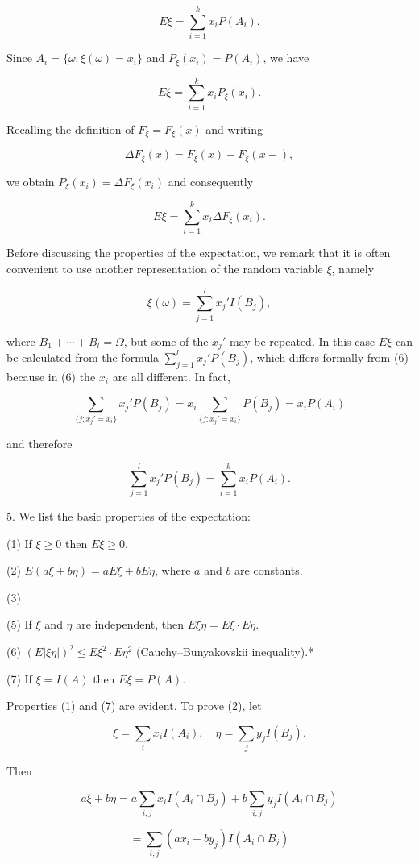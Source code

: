 $$E \xi = \sum_{i=1}^{k} x_i P(A_i).$$

Since $A_i = \{\omega : \xi(\omega) = x_i\}$ and $P_\xi(x_i) = P(A_i)$, we have

$$E \xi = \sum_{i=1}^{k} x_i P_\xi(x_i).$$

Recalling the definition of $F_\xi = F_\xi(x)$ and writing

$$\Delta F_\xi(x) = F_\xi(x) - F_\xi(x-),$$

we obtain $P_\xi(x_i) = \Delta F_\xi(x_i)$ and consequently

$$E \xi = \sum_{i=1}^{k} x_i \Delta F_\xi(x_i).$$

Before discussing the properties of the expectation, we remark that it is often convenient to use another representation of the random variable $\xi$, namely

$$\xi(\omega) = \sum_{j=1}^{l} x_j' I(B_j),$$

where $B_1 + \cdots + B_l = \Omega$, but some of the $x_j'$ may be repeated. In this case $E \xi$ can be calculated from the formula $\sum_{j=1}^{l} x_j' P(B_j)$, which differs formally from (6) because in (6) the $x_i$ are all different. In fact,

$$\sum_{\{j: x_j' = x_i\}} x_j' P(B_j) = x_i \sum_{\{j: x_j' = x_i\}} P(B_j) = x_i P(A_i)$$

and therefore

$$\sum_{j=1}^{l} x_j' P(B_j) = \sum_{i=1}^{k} x_i P(A_i).$$

5. We list the basic properties of the expectation:

(1) If $\xi \geq 0$ then $E \xi \geq 0$.

(2) $E(a\xi + b\eta) = aE\xi + bE\eta$, where $a$ and $b$ are constants.

(3)

(5) If $\xi$ and $\eta$ are independent, then $E \xi \eta = E \xi \cdot E \eta$.

(6) $(E | \xi \eta|)^2 \leq E \xi^2 \cdot E \eta^2$ (Cauchy–Bunyakovskii inequality).*

(7) If $\xi = I(A)$ then $E \xi = P(A)$.

Properties (1) and (7) are evident. To prove (2), let

$$\xi = \sum_i x_i I(A_i), \quad \eta = \sum_j y_j I(B_j).$$

Then

$$a \xi + b \eta = a \sum_{i,j} x_i I(A_i \cap B_j) + b \sum_{i,j} y_j I(A_i \cap B_j)$$

$$= \sum_{i,j} (ax_i + by_j) I(A_i \cap B_j)$$

